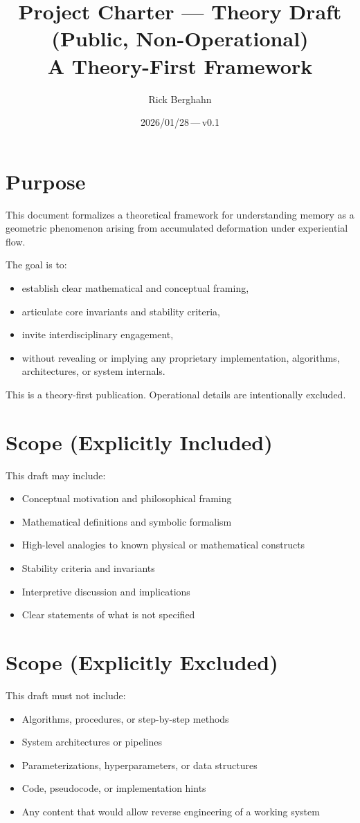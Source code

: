 \documentclass[11pt]{article}
\title{Project Charter --- Theory Draft (Public, Non-Operational)\\
\large A Theory-First Framework}
\author{Rick Berghahn}
\date{2026/01/28\,---\,v0.1}
\begin{document}
\maketitle

\section*{Purpose}
This document formalizes a theoretical framework for understanding memory as a geometric phenomenon arising from accumulated deformation under experiential flow.

The goal is to:
\begin{itemize}
  \item establish clear mathematical and conceptual framing,
  \item articulate core invariants and stability criteria,
  \item invite interdisciplinary engagement,
  \item without revealing or implying any proprietary implementation, algorithms, architectures, or system internals.
\end{itemize}

This is a theory-first publication. Operational details are intentionally excluded.

\section*{Scope (Explicitly Included)}
This draft may include:
\begin{itemize}
  \item Conceptual motivation and philosophical framing
  \item Mathematical definitions and symbolic formalism
  \item High-level analogies to known physical or mathematical constructs
  \item Stability criteria and invariants
  \item Interpretive discussion and implications
  \item Clear statements of what is not specified
\end{itemize}

\section*{Scope (Explicitly Excluded)}
This draft must not include:
\begin{itemize}
  \item Algorithms, procedures, or step-by-step methods
  \item System architectures or pipelines
  \item Parameterizations, hyperparameters, or data structures
  \item Code, pseudocode, or implementation hints
  \item Any content that would allow reverse engineering of a working system
\end{itemize}
\end{document}
